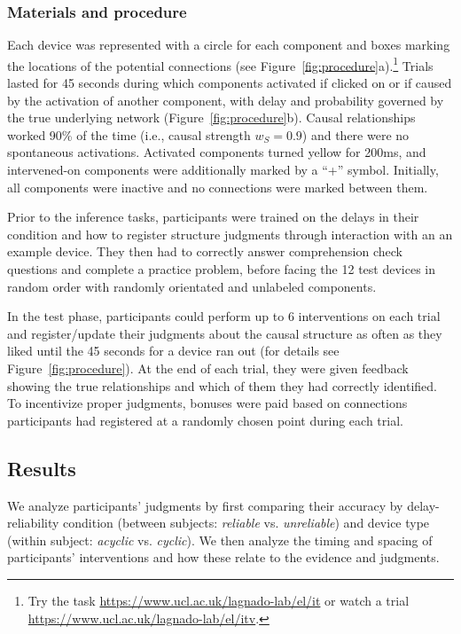 \documentclass[10pt,letterpaper]{article}
\newcommand{\ws}{w_S} %
\begin{document}
\subsubsection*{Materials and procedure}


Each device was represented with a circle for each component and boxes marking the locations of the potential connections (see Figure~\ref{fig:procedure}a).\footnote{Try the task \url{https://www.ucl.ac.uk/lagnado-lab/el/it} or watch a trial \url{https://www.ucl.ac.uk/lagnado-lab/el/itv}.} 
Trials lasted for 45 seconds during which components activated if clicked on or if caused by the activation of another component, with delay and probability governed by the true underlying network (Figure~\ref{fig:procedure}b).  Causal relationships worked 90\% of the time (i.e., causal strength $\ws=0.9$) and there were no spontaneous activations.  Activated components turned yellow for 200ms, and intervened-on components were additionally marked by a ``+'' symbol. Initially, all components were inactive and no connections were marked between them.

Prior to the inference tasks, participants were trained on the delays in their condition and how to register structure judgments through interaction with an an example device.  They then had to correctly answer comprehension check questions and complete a practice problem, before facing the 12 test devices in random order with randomly orientated and unlabeled components.

In the test phase, participants could perform up to 6 interventions on each trial and register/update their judgments about the causal structure as often as they liked until the 45 seconds for a device ran out (for details see Figure~\ref{fig:procedure}). At the end of each trial, they were given feedback showing the true relationships and which of them they had correctly identified. To incentivize proper judgments, bonuses were paid based on connections participants had registered at a randomly chosen point during each trial. 



\subsection{Results}
We analyze participants' judgments by first comparing their accuracy by delay-reliability condition (between subjects: \emph{reliable} vs. \emph{unreliable}) and device type (within subject: \emph{acyclic} vs. \emph{cyclic}).  We then analyze the timing and spacing of participants' interventions and how these relate to the evidence and judgments.
\end{document}

